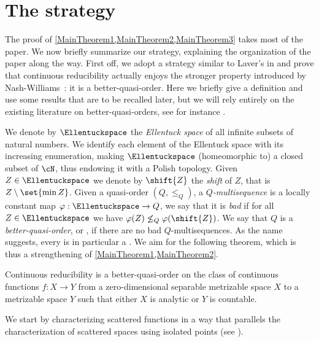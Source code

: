 \section{The strategy}

The proof of \cref{MainTheorem1,MainTheorem2,MainTheorem3} takes most of the paper. We now briefly summarize our strategy, explaining the organization of the paper along the way.
First off, we adopt a strategy similar to Laver's in \cite{laverfraisse} and prove that continuous reducibility actually enjoys the stronger property introduced by Nash-Williams~\cite{nash1965well}: it is a better-quasi-order.
Here we briefly give a definition and use some results that are to be recalled later, but we will rely entirely on the existing literature on better-quasi-orders,
see for instance \cite{simpsonbqo,marcone1994foundations,yann2017towardsbetter,wellbetterinbetween}.

We denote by $\Ellentuckspace$ the \emph{Ellentuck space} of all infinite subsets of natural numbers.
We identify each element of the Ellentuck space with its increasing enumeration, making $\Ellentuckspace$ (homeomorphic to) a closed subset of $\cN$,
thus endowing it with a Polish topology. Given $Z\in\Ellentuckspace$ we denote by $\shift{Z}$ the \emph{shift} of $Z$, that is $Z\setminus\set{\min{Z}}$.
Given a quasi-order $(Q,\leq_Q)$, a \emph{$Q$-multisequence} is a locally constant map $\varphi:\Ellentuckspace\to Q$, we say that it is \emph{bad} if
for all $Z\in\Ellentuckspace$ we have $\varphi(Z)\not\leq_Q\varphi(\shift{Z})$. We say that $Q$ is a \emph{better-quasi-order}, or \bqo{}, if there are no bad $Q$-multisequences.
As the name suggests, every \bqo{} is in particular a \wqo{}. We aim for the following theorem, which is thus a strengthening of \cref{MainTheorem1,MainTheorem2}.


\begin{Theorem}\label{Introthm:BQO}
Continuous reducibility is a better-quasi-order on the class of continuous functions $f:X\to Y$ from a zero-dimensional separable metrizable space $X$ to a metrizable space $Y$ such that either $X$ is analytic or $Y$ is countable. 
\end{Theorem}


We start by characterizing scattered functions in a way that parallels the characterization of scattered spaces using isolated points (see \cite{SierpMazCompDen,Frechet1927,MR0107849}).

